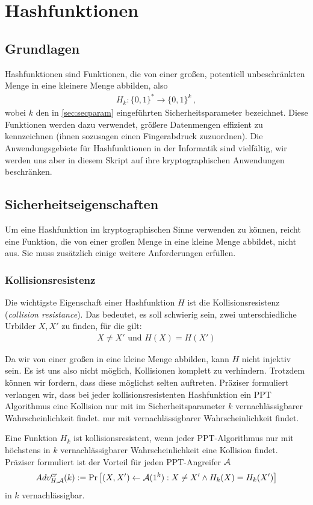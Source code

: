 \chapter{Hashfunktionen}\label{cha:hash}
\section{Grundlagen}
Hashfunktionen \indexHashFunction sind Funktionen, die von einer großen, potentiell unbeschränkten Menge in eine kleinere Menge abbilden, also
\begin{align*}
H_k\colon \{0,1\}^* \rightarrow \{0,1\}^k\, ,
\end{align*}
wobei $k$ den in \ref{sec:secparam} eingeführten Sicherheitsparameter bezeichnet.
Diese Funktionen werden dazu verwendet, größere Datenmengen effizient zu kennzeichnen (ihnen sozusagen einen Fingerabdruck zuzuordnen). Die Anwendungsgebiete für Hashfunktionen in der Informatik sind vielfältig, wir werden uns aber in diesem Skript auf ihre kryptographischen Anwendungen beschränken\indexCryptHashFunction.

\section{Sicherheitseigenschaften}
Um eine Hashfunktion im kryptographischen Sinne \indexCryptHashFunction verwenden zu können, reicht eine Funktion, die von einer großen Menge in eine kleine Menge abbildet, nicht aus.
Sie muss zusätzlich einige weitere Anforderungen erfüllen.

\subsection{Kollisionsresistenz}
Die wichtigste Eigenschaft einer Hashfunktion $H$ ist die Kollisionsresistenz (\emph{collision resistance})\indexCollisionResistance. Das bedeutet, es soll schwierig sein, zwei
unterschiedliche Urbilder $X, X'$ zu finden, für die gilt: 
\begin{align*}
X \neq X' \text{ und } H(X) = H(X')
\end{align*}

Da wir von einer großen in eine kleine Menge abbilden, kann $H$ nicht injektiv sein. Es ist uns also nicht möglich, Kollisionen komplett zu
verhindern. Trotzdem können wir fordern, dass diese möglichst selten auftreten. Präziser formuliert verlangen wir, dass bei jeder
kollisionsresistenten Hashfunktion ein PPT Algorithmus eine Kollision
nur mit im Sicherheitsparameter $k$ vernachlässigbarer Wahrscheinlichkeit findet.
 nur mit vernachlässigbarer Wahrscheinlichkeit findet.
\begin{definition}[Kollisionsresistenz]
Eine Funktion $H_k$ ist kollisionsresistent\indexCollisionResistance, wenn jeder PPT-Algorithmus
nur mit höchstens in $k$ vernachlässigbarer Wahrscheinlichkeit eine Kollision findet.
Präziser formuliert ist der Vorteil für jeden PPT-Angreifer $\mathcal{A}$
\begin{align*}
Adv^{cr}_{H,\mathcal{A}}(k):= \Pr \left[ (X, X') \leftarrow \mathcal{A}(1^k) : X \neq X' \land H_k(X) = H_k(X')\right]
\end{align*}
in $k$ vernachlässigbar.
\end{definition}

